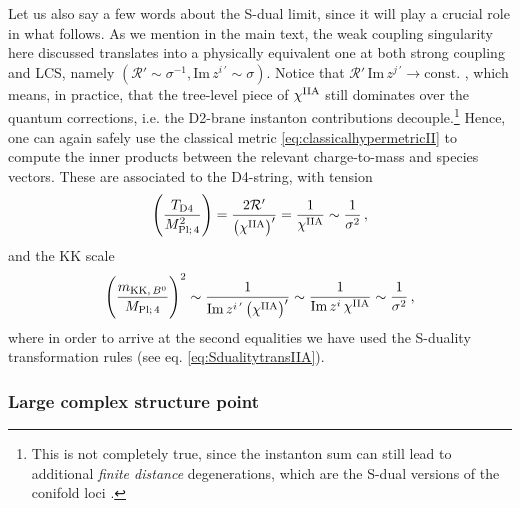 Let us also say a few words about the S-dual limit, since it will play a crucial role in what follows. As we mention in the main text, the weak coupling singularity here discussed translates into a physically equivalent one at both strong coupling and LCS, namely $\left( \mathcal{R}' \sim \sigma^{-1} , \text{Im}\, z^{i\, '} \sim \sigma \right)$. Notice that $\mathcal{R}'\, \text{Im}\, z^{j\, '} \to \text{const.}$ , which means, in practice, that the tree-level piece of $\chi^{\rm IIA}$ still dominates over the quantum corrections, i.e. the D2-brane instanton contributions decouple.\footnote{This is not completely true, since the instanton sum can still lead to additional \emph{finite distance} degenerations, which are the S-dual versions of the conifold loci \cite{Candelas:1989js}.} Hence, one can again safely use the classical metric \eqref{eq:classicalhypermetricII} to compute the inner products between the relevant charge-to-mass and species vectors. These are associated to the D4-string, with tension
%
\begin{equation}\label{eq:D4SYZSdual}
	\left(\frac{T_{\text{D4}}}{M_{\text{Pl;}\, 4}^2} \right)= \frac{2 \mathcal{R}'}{\left(\chi^{\rm IIA}\right)'} = \frac{1}{\chi^{\rm IIA}} \sim \frac{1}{\sigma^{2}}\, ,
\end{equation}
%
and the KK scale
%
\begin{equation}\label{eq:KKSYZSdual}
	\left(\frac{m_{\text{KK},\, B^0}}{M_{\text{Pl;}\, 4}} \right)^2 \sim \frac{1}{\text{Im}\, z^{i\, '} \left(\chi^{\rm IIA}\right)'} \sim  \frac{1}{\text{Im}\, z^{i}\, \chi^{\rm IIA}} \sim \frac{1}{\sigma^2}\, ,
\end{equation}
%
where in order to arrive at the second equalities we have used the S-duality transformation rules (see eq. \eqref{eq:SdualitytransIIA}). 
	
\subsubsection*{Large complex structure point}
	
